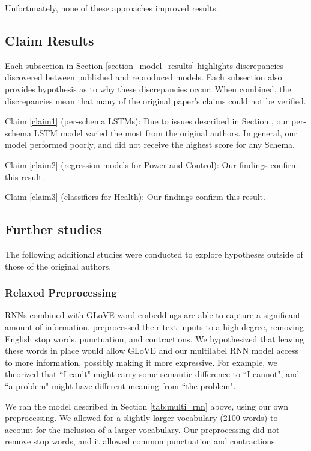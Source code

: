 \documentclass[11pt,a4paper]{article}
\begin{document}
Unfortunately, none of these approaches improved results.

\subsection{Claim Results}
Each subsection in Section \ref{section_model_results} highlights discrepancies discovered between published and reproduced models. Each subsection also provides hypothesis as to why these discrepancies occur. When combined, the discrepancies mean that many of the original paper's claims could not be verified. 

Claim \ref{claim1} (per-schema LSTMs): Due to issues described in Section \label{section:per_schema_rnn}, our per-schema LSTM model varied the most from the original authors. In general, our model performed poorly, and did not receive the highest score for any Schema.  

Claim \ref{claim2} (regression models for Power and Control): Our findings confirm this result. 

Claim \ref{claim3} (classifiers for Health): Our findings confirm this result. 

\subsection{Further studies}
\label{further_studies}
The following additional studies were conducted to explore hypotheses outside of those of the original authors. 
\subsubsection{Relaxed Preprocessing}
\label{section:relaxed_preprocessing}
RNNs combined with GLoVE word embeddings are able to capture a significant amount of information. \citeauthor{burger_2021} preprocessed their text inputs to a high degree, removing English stop words, punctuation, and contractions. We hypothesized that leaving these words in place would allow GLoVE and our multilabel RNN model access to more information, possibly making it more expressive. For example, we theorized that ``I can't" might carry some semantic difference to ``I cannot", and ``a problem" might have different meaning from ``the problem". 

We ran the model described in Section \ref{tab:multi_rnn} above, using our own preprocessing. We allowed for a slightly larger vocabulary (2100 words) to account for the inclusion of a larger vocabulary. Our preprocessing did not remove stop words, and it allowed common punctuation and contractions. 
\end{document}
